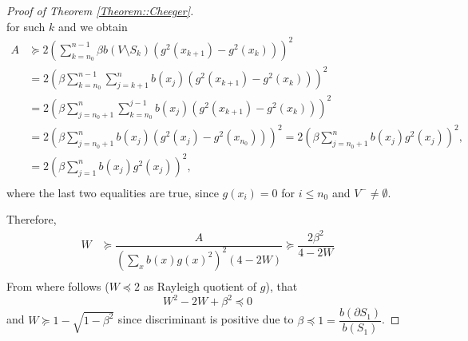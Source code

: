 \documentclass[10pt,a4paper]{amsart}
\newcommand{\weight}{b}
\begin{document}
\begin{proof}[Proof of Theorem \ref{Theorem::Cheeger}]
$$$$
for such $k$ and we obtain
\begin{align*}
A&\succeq 2 \left(\sum_{k=n_0}^{n-1}\beta \weight(V\setminus S_k)(g^2(x_{k+1})-g^2(x_k))\right)^2\\
&= 2 \left(\beta\sum_{k=n_0}^{n-1}\sum_{j=k+1}^n \weight (x_j)(g^2(x_{k+1})-g^2(x_k))\right)^2\\
&= 2 \left(\beta\sum_{j=n_0+1}^{n}\sum_{k=n_0}^{j-1} \weight (x_j)(g^2(x_{k+1})-g^2(x_k))\right)^2\\
&= 2 \left(\beta\sum_{j=n_0+1}^{n}\weight (x_j)(g^2(x_{j})-g^2(x_{n_0}))\right)^2= 2 \left(\beta\sum_{j=n_0+1}^{n}\weight (x_j)g^2(x_{j})\right)^2,\\
&= 2 \left(\beta\sum_{j=1}^{n}\weight (x_j)g^2(x_{j})\right)^2,\\
\end{align*}
where the last two equalities are true, since $g(x_i)=0$ for $i\le n_0$ and $V^-\ne \emptyset$.

Therefore,
\begin{align*}
W&\succeq \dfrac{A}{\left(\sum_x \weight (x)g(x)^2\right)^2 (4-2W)}\succeq \dfrac{2\beta^2}{4-2W}\\
\end{align*}
From where follows ($W\preceq 2$ as Rayleigh quotient of $g$), that
$$
W^2-2W+\beta^2\preceq 0
$$
and 
$W\succeq 1-\sqrt{1-\beta^2}$ since discriminant is positive due to $\beta\preceq 1=\dfrac{\weight(\partial S_1)}{\weight(S_1)}$.

\end{proof}
\end{document}

